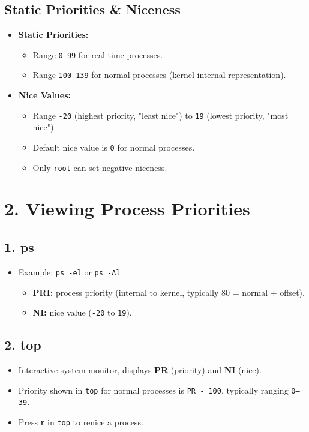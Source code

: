 \documentclass[a4paper]{report}
\begin{document}
\subsection*{Static Priorities \& Niceness}
\begin{itemize}
    \item \textbf{Static Priorities:}
    \begin{itemize}
        \item Range \texttt{0–99} for real-time processes.
        \item Range \texttt{100–139} for normal processes (kernel internal representation).
    \end{itemize}
    \item \textbf{Nice Values:}
    \begin{itemize}
        \item Range \texttt{-20} (highest priority, "least nice") to \texttt{19} (lowest priority, "most nice").
        \item Default nice value is \texttt{0} for normal processes.
        \item Only \texttt{root} can set negative niceness.
    \end{itemize}
\end{itemize}

\section*{2. Viewing Process Priorities}

\subsection*{1. ps}
\begin{itemize}
    \item Example: \texttt{ps -el} or \texttt{ps -Al}
    \begin{itemize}
        \item \textbf{PRI:} process priority (internal to kernel, typically 80 = normal + offset).
        \item \textbf{NI:} nice value (\texttt{-20} to \texttt{19}).
    \end{itemize}
\end{itemize}

\subsection*{2. top}
\begin{itemize}
    \item Interactive system monitor, displays \textbf{PR} (priority) and \textbf{NI} (nice).
    \item Priority shown in \texttt{top} for normal processes is \texttt{PR - 100}, typically ranging \texttt{0–39}.
    \item Press \textbf{r} in \texttt{top} to renice a process.
\end{itemize}
\end{document}
